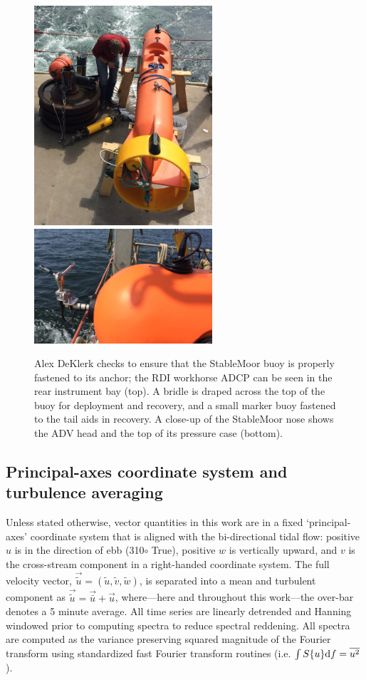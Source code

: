 \documentclass[twocol]{ametsoc}
\begin{document}
\begin{figure}[t]
  \centering
  \includegraphics[width=2.6in]{SM_ondeck01}
  \includegraphics[width=2.6in]{SM_NoseMode01}
  \caption{Alex DeKlerk checks to ensure that the StableMoor buoy is properly fastened to its anchor; the RDI workhorse ADCP can be seen in the rear instrument bay (top). A bridle is draped across the top of the buoy for deployment and recovery, and a small marker buoy fastened to the tail aids in recovery.  A close-up of the StableMoor nose shows the ADV head and the top of its pressure case (bottom). }
  \label{fig:SM}
\end{figure}


\subsection{Principal-axes coordinate system and turbulence averaging}

Unless stated otherwise, vector quantities in this work are in a fixed `principal-axes' coordinate system that is aligned with the bi-directional tidal flow: positive $u$ is in the direction of ebb (310$\circ$ True), positive $w$ is vertically upward, and $v$ is the cross-stream component in a right-handed coordinate system. The full velocity vector, $\vec{\tilde{u}} = (\tilde{u}, \tilde{v}, \tilde{w})$, is separated into a mean and turbulent component as $\vec{\tilde{u}} = \vec{\bar{u}} + \vec{u}$, where---here and throughout this work---the over-bar denotes a 5 minute average.  All time series are linearly detrended and Hanning windowed prior to computing spectra to reduce spectral reddening. All spectra are computed as the variance preserving squared magnitude of the Fourier transform using standardized fast Fourier transform routines (i.e. $\int S\{u\}\mathrm{d}f = \overline{u^2}$).
\end{document}
